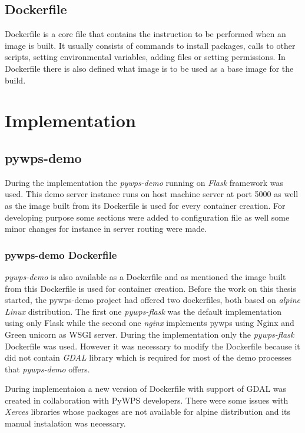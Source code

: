 \documentclass{gifce}
\begin{document}
\subsection{Dockerfile}
Dockerfile is a core file that contains the instruction to be performed when an image is built. It usually consists of commands to install packages, calls to other scripts, setting environmental variables, adding files or setting permissions. In Dockerfile there is also defined what image is to be used as a base image for the build.

\section{Implementation}
\subsection{pywps-demo}
During the implementation the \textit{pywps-demo}
 running on \textit{Flask} framework was
used. This demo server instance runs on host machine server at port
5000 as well as the image built from its Dockerfile is used for every
container creation. For developing purpose some sections were added to
configuration file as well some minor changes for instance in server
routing were made.

\subsubsection{pywps-demo Dockerfile}
\textit{pywps-demo} is also available as a Dockerfile and as mentioned
the image built from this Dockerfile is used for container creation.
Before the work on this thesis started, the pywps-demo project had
offered two dockerfiles, both based on \textit{alpine Linux}
distribution. The first one \textit{pywps-flask} was the default
implementation using only Flask while the second one \textit{nginx}
implements pywps using Nginx and Green unicorn as WSGI server. During
the implementation only the \textit{pywps-flask} Dockerfile was
used. However it was necessary to modify the Dockerfile because it did
not contain \textit{GDAL} library which is required for most of the
demo processes that \textit{pywps-demo} offers.

During implementaion a new version of Dockerfile with
support of GDAL was created in collaboration with PyWPS
developers. There were some issues with \textit{Xerces} libraries
whose packages are not available for alpine distribution and its
manual instalation was necessary. 
\end{document}
